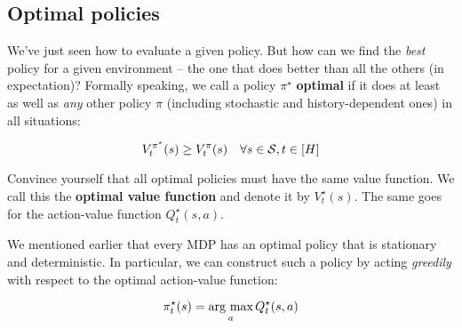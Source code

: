 \documentclass[../main/main]{subfiles}
\begin{document}

\subsection{Optimal policies}

We've just seen how to evaluate a given policy. But how can we find the \emph{best} policy for a given environment -- the one that does better than all the others (in expectation)? Formally speaking, we call a policy $\pi^\star$ \textbf{optimal} if it does at least as well as \emph{any} other policy $\pi$ (including stochastic and history-dependent ones) in all situations:

\[
    V_t^{\pi^\star}(s) \geq V_t^\pi(s) \quad \forall s \in \S, t \in [H]
\]

Convince yourself that all optimal policies must have the same value function. We call this the \textbf{optimal value function} and denote it by $V_t^\star(s)$. The same goes for the action-value function $Q_t^\star(s, a)$.

We mentioned earlier that every MDP has an optimal policy that is stationary and deterministic. In particular, we can construct such a policy by acting \emph{greedily} with respect to the optimal action-value function:

\[
    \pi_t^\star(s) = \argmax_a Q_t^\star(s, a)
\]
\end{document}

